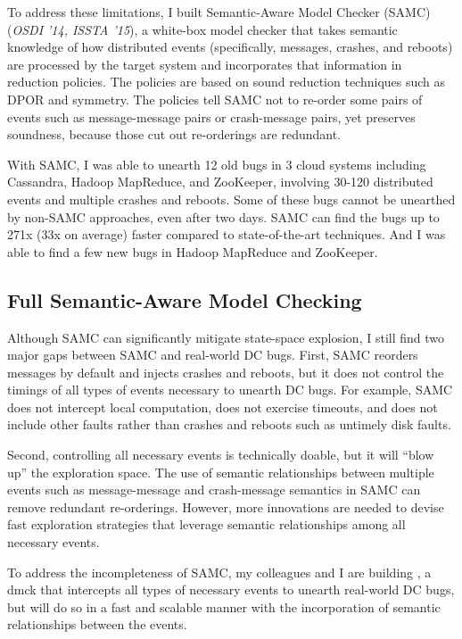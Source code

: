 \documentclass[11pt]{article}
\begin{document}
To address these limitations, I built Semantic-Aware Model Checker (SAMC)
(\textit{OSDI '14, ISSTA '15}), a white-box model checker that takes semantic
knowledge of how distributed events (specifically, messages, crashes, and
reboots) are processed by the target system and incorporates that information in
reduction policies. The policies are based on sound reduction techniques such as
DPOR and symmetry. The policies tell SAMC not to re-order some pairs of events
such as message-message pairs or crash-message pairs, yet preserves soundness,
because those cut out re-orderings are redundant.

With SAMC, I was able to unearth 12 old bugs in 3 cloud systems including
Cassandra, Hadoop MapReduce, and ZooKeeper, involving 30-120 distributed events
and multiple crashes and reboots. Some of these bugs cannot be unearthed by
non-SAMC approaches, even after two days. SAMC can find the bugs up to 271x (33x
on average) faster compared to state-of-the-art techniques. And I was able to
find a few new bugs in Hadoop MapReduce and ZooKeeper.

\subsection{Full Semantic-Aware Model Checking} 

Although SAMC can significantly mitigate state-space explosion, I still find two
major gaps between SAMC and real-world DC bugs. First, SAMC reorders messages by
default and injects crashes and reboots, but it does not control the timings of
all types of events necessary to unearth DC bugs. For example, SAMC does not
intercept local computation, does not exercise timeouts, and does not include
other faults rather than crashes and reboots such as untimely disk faults.

Second, controlling all necessary events is technically doable, but it will
``blow up'' the exploration space. The use of semantic relationships between
multiple events such as message-message and crash-message semantics in SAMC can
remove redundant re-orderings. However, more innovations are needed to devise
fast exploration strategies that leverage semantic relationships among all
necessary events.

To address the incompleteness of SAMC, my colleagues and I are building
\fullcheck, a dmck that intercepts all types of necessary events to unearth
real-world DC bugs, but will do so in a fast and scalable manner with the
incorporation of semantic relationships between the events.
\end{document}
